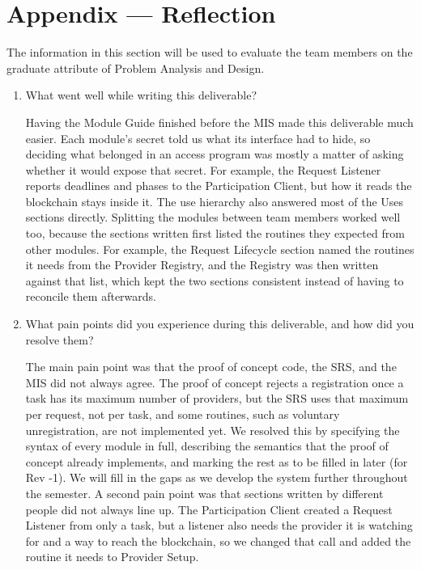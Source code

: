 \documentclass[12pt, titlepage]{article}
\begin{document}
\newpage{}

\section{Appendix --- Reflection}


The information in this section will be used to evaluate the team members on the
graduate attribute of Problem Analysis and Design.



\begin{enumerate}
  \item What went well while writing this deliverable?

  Having the Module Guide finished before the MIS made this deliverable much
  easier. Each module's secret told us what its interface had to hide, so
  deciding what belonged in an access program was mostly a matter of asking
  whether it would expose that secret. For example, the Request Listener
  reports deadlines and phases to the Participation Client, but how it reads
  the blockchain stays inside it. The use hierarchy also answered most of the
  Uses sections directly. Splitting the modules between team members worked
  well too, because the sections written first listed the routines they
  expected from other modules. For example, the Request Lifecycle section named
  the routines it needs from the Provider Registry, and the Registry was then
  written against that list, which kept the two sections consistent instead of
  having to reconcile them afterwards.

  \item What pain points did you experience during this deliverable, and how
    did you resolve them?

  The main pain point was that the proof of concept code, the SRS, and the MIS
  did not always agree. The proof of concept rejects a registration once a task
  has its maximum number of providers, but the SRS uses that maximum per
  request, not per task, and some routines, such as voluntary unregistration,
  are not implemented yet. We resolved this by specifying the syntax of every
  module in full, describing the semantics that the proof of concept already
  implements, and marking the rest as to be filled in later (for Rev -1). 
  We will fill in the gaps as we develop the system further throughout the semester.
  A second pain point was that sections
  written by different people did not always line up. The Participation Client
  created a Request Listener from only a task, but a listener also needs the
  provider it is watching for and a way to reach the blockchain, so we changed
  that call and added the routine it needs to Provider Setup.


\end{enumerate}
\end{document}
